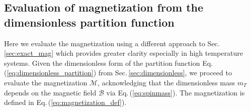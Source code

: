 \documentclass[epjST]{svjour}
\newcommand{\req}[1]{Eq.\,(\ref{#1})}
\newcommand{\rsec}[1]{Sec.\,{\ref{#1}}}
\numberwithin{equation}{section}
\begin{document}
\subsection{Evaluation of magnetization from the dimensionless partition function}
\label{sec:magnetization_evaluation}
Here we evaluate the magnetization using a different approach to \rsec{sec:exact_mag} which provides greater clarity especially in high temperature systems. Given the dimensionless form of the partition function \req{eq:dimensionless_partition} from \rsec{sec:dimensionless}, we proceed to evaluate the magnetization \(\mathcal{M}\), acknowledging that the dimensionless mass \(m_{T}\) depends on the magnetic field \(\mathcal{B}\) via \req{eq:spinmass}. The magnetization is defined in \req{eq:magnetization_def}. 
\end{document}
